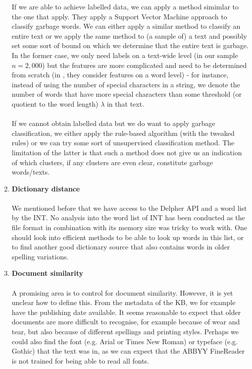 \documentclass{article}
\begin{document}
\begin{enumerate}
		If we are able to achieve labelled data, we can apply a method simimlar to the one that \cite{wudtke2011recognizing} apply. They apply a Support Vector Machine approach to classify garbage words. We can either apply a similar method to classify an entire text or we apply the same method to (a sample of) a text and possibly set some sort of bound on which we determine that the entire text is garbage. In the former case, we only need labels on a text-wide level (in our sample $n=2,000$) but the features are more complicated and need to be determined from scratch (in \cite{wudtke2011recognizing}, they consider features on a word level) - for instance, instead of using the number of special characters in a string, we denote the number of words that have more special characters than some threshold (or quotient to the word length) $\lambda$ in that text.
		\\ \\
		If we cannot obtain labelled data but we do want to apply garbage classification, we either apply the rule-based algorithm (with the tweaked rules) or we can try some sort of unsupervised classification method. The limitation of the latter is that such a method does not give us an indication of which clusters, if any clusters are even clear, constitute garbage words/texts. 
		
		\item \textbf{Dictionary distance}
		\\ \\
		We mentioned before that we have access to the Delpher API and a word list by the INT. No analysis into the word list of INT has been conducted as the file format in combination with its memory size was tricky to work with. One should look into efficient methods to be able to look up words in this list, or to find another good dictionary source that also contains words in older spelling variations.
		
		\item \textbf{Document similarity}
		\\ \\
		A promising area is to control for document similarity. However, it is yet unclear how to define this. From the metadata of the KB, we for example have the publishing date available. It seems reasonable to expect that older documents are more difficult to recognise, for example because of wear and tear, but also because of different spellings and printing styles. Perhaps we could also find the font (e.g. Arial or Times New Roman) or typeface (e.g. Gothic) that the text was in, as we can expect that the ABBYY FineReader is not trained for being able to read all fonts.
		

\end{enumerate}
\end{document}
